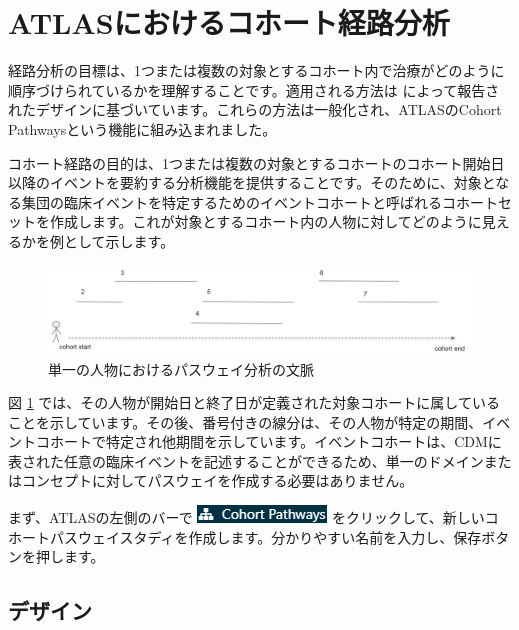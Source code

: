 \documentclass[
  11pt]{book}
\theoremstyle{definition}
\theoremstyle{definition}
\theoremstyle{definition}
\theoremstyle{definition}
\theoremstyle{remark}
\begin{document}
\section{ATLASにおけるコホート経路分析}\label{atlasux306bux304aux3051ux308bux30b3ux30dbux30fcux30c8ux7d4cux8defux5206ux6790}

経路分析の目標は、1つまたは複数の対象とするコホート内で治療がどのように順序づけられているかを理解することです。適用される方法は \citet{Hripcsak7329} によって報告されたデザインに基づいています。これらの方法は一般化され、ATLASのCohort Pathwaysという機能に組み込まれました。

コホート経路の目的は、1つまたは複数の対象とするコホートのコホート開始日以降のイベントを要約する分析機能を提供することです。そのために、対象となる集団の臨床イベントを特定するためのイベントコホートと呼ばれるコホートセットを作成します。これが対象とするコホート内の人物に対してどのように見えるかを例として示します。

\begin{figure}

{\centering \includegraphics[width=1\linewidth]{images/Characterization/pathwaysPersonEventView} 

}

\caption{単一の人物におけるパスウェイ分析の文脈}\label{fig:pathwaysPersonEventView}
\end{figure}

図 \ref{fig:pathwaysPersonEventView} では、その人物が開始日と終了日が定義された対象コホートに属していることを示しています。その後、番号付きの線分は、その人物が特定の期間、イベントコホートで特定され他期間を示しています。イベントコホートは、CDMに表された任意の臨床イベントを記述することができるため、単一のドメインまたはコンセプトに対してパスウェイを作成する必要はありません。

まず、ATLASの左側のバーで \includegraphics{images/Characterization/atlasPathwaysMenuItem.png} をクリックして、新しいコホートパスウェイスタディを作成します。分かりやすい名前を入力し、保存ボタンを押します。

\subsection{デザイン}\label{ux30c7ux30b6ux30a4ux30f3-1}
\end{document}
